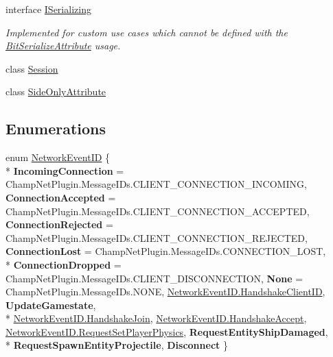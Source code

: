 \begin{DoxyCompactItemize}
interface \hyperlink{interface_skyrates_1_1_common_1_1_network_1_1_i_serializing}{I\-Serializing}
\begin{DoxyCompactList}\small\item\em Implemented for custom use cases which cannot be defined with the \hyperlink{class_skyrates_1_1_common_1_1_network_1_1_bit_serialize_attribute}{Bit\-Serialize\-Attribute} usage. \end{DoxyCompactList}\item 
class \hyperlink{class_skyrates_1_1_common_1_1_network_1_1_session}{Session}
\item 
class \hyperlink{class_skyrates_1_1_common_1_1_network_1_1_side_only_attribute}{Side\-Only\-Attribute}
\end{DoxyCompactItemize}
\subsection*{Enumerations}
\begin{DoxyCompactItemize}
\item 
enum \hyperlink{namespace_skyrates_1_1_common_1_1_network_a90fc6faa44c44b4284114e861d3e761a}{Network\-Event\-I\-D} \{ \\*
{\bfseries Incoming\-Connection} = Champ\-Net\-Plugin.\-Message\-I\-Ds.\-C\-L\-I\-E\-N\-T\-\_\-\-C\-O\-N\-N\-E\-C\-T\-I\-O\-N\-\_\-\-I\-N\-C\-O\-M\-I\-N\-G, 
{\bfseries Connection\-Accepted} = Champ\-Net\-Plugin.\-Message\-I\-Ds.\-C\-L\-I\-E\-N\-T\-\_\-\-C\-O\-N\-N\-E\-C\-T\-I\-O\-N\-\_\-\-A\-C\-C\-E\-P\-T\-E\-D, 
{\bfseries Connection\-Rejected} = Champ\-Net\-Plugin.\-Message\-I\-Ds.\-C\-L\-I\-E\-N\-T\-\_\-\-C\-O\-N\-N\-E\-C\-T\-I\-O\-N\-\_\-\-R\-E\-J\-E\-C\-T\-E\-D, 
{\bfseries Connection\-Lost} = Champ\-Net\-Plugin.\-Message\-I\-Ds.\-C\-O\-N\-N\-E\-C\-T\-I\-O\-N\-\_\-\-L\-O\-S\-T, 
\\*
{\bfseries Connection\-Dropped} = Champ\-Net\-Plugin.\-Message\-I\-Ds.\-C\-L\-I\-E\-N\-T\-\_\-\-D\-I\-S\-C\-O\-N\-N\-E\-C\-T\-I\-O\-N, 
{\bfseries None} = Champ\-Net\-Plugin.\-Message\-I\-Ds.\-N\-O\-N\-E, 
\hyperlink{namespace_skyrates_1_1_common_1_1_network_a90fc6faa44c44b4284114e861d3e761aa908d5d0d1dcdac6a031195157436dbc3}{Network\-Event\-I\-D.\-Handshake\-Client\-I\-D}, 
{\bfseries Update\-Gamestate}, 
\\*
\hyperlink{namespace_skyrates_1_1_common_1_1_network_a90fc6faa44c44b4284114e861d3e761aae1ed8fdcd01caace5506395496004e93}{Network\-Event\-I\-D.\-Handshake\-Join}, 
\hyperlink{namespace_skyrates_1_1_common_1_1_network_a90fc6faa44c44b4284114e861d3e761aa687268a9c39eb0452e4bf727ebc788f0}{Network\-Event\-I\-D.\-Handshake\-Accept}, 
\hyperlink{namespace_skyrates_1_1_common_1_1_network_a90fc6faa44c44b4284114e861d3e761aa4580f9f0cb71411e3ef1bf8023965089}{Network\-Event\-I\-D.\-Request\-Set\-Player\-Physics}, 
{\bfseries Request\-Entity\-Ship\-Damaged}, 
\\*
{\bfseries Request\-Spawn\-Entity\-Projectile}, 
{\bfseries Disconnect}
 \}
\end{DoxyCompactItemize}
